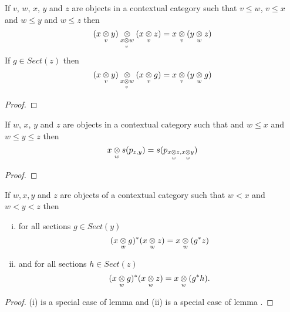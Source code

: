 \begin{lemma}
If $v$, $w$, $x$, $y$ and $z$ are objects in a contextual category  \catcw 
such that $v \leq w$, $v \leq x$ and $w \leq y$ and $w \leq z$ then
\begin{equation*}
\crossx{(\crossx{x}{y}{v})}{(\crossx{x}{z}{v})}{\crossx{x}{w}{v}}=\crossx{x}{{(\crossx{y}{z}{w})}}{v}
\end{equation*}
If $g \in Sect(z)$ then
\begin{equation*}
\crossx{(\crossx{x}{y}{v})}{(\crossx{x}{g}{v})}{\crossx{x}{w}{v}}=\crossx{x}{{(\crossx{y}{g}{w})}}{v}
\end{equation*}
\end{lemma}
\begin{proof}
\tbd
\end{proof}

\begin{lemma}
If $w$, $x$, $y$ and $z$ are objects in a contextual category  \catcw 
such that  and $w \leq x$ and $w \leq y \leq z$ then
\begin{equation*}
\crossx{x}{s(p_{z,y})}{w}= s(p_{\crossx{x}{z}{w},\crossx{x}{y}{w}})
\end{equation*}
\end{lemma}
\begin{proof}
\tbd
\end{proof}

\begin{lemma}
If $w,x,y$ and $z$ are objects of a contextual category \catcw such that $w < x$ and  $w < y < z$ then  
\begin{enumerate}[(i)]
\item for all sections $g \in Sect(y)$ 
\begin{equation*}
(\crossx{x}{g}{w})^*(\crossx{x}{z}{w})=\crossx{x}{(g^*z)}{w}
\end{equation*}
\item and for all sections $h \in Sect(z)$ 
\begin{equation*}
(\crossx{x}{g}{w})^*(\crossx{x}{z}{w})=\crossx{x}{(g^*h)}{w}.
\end{equation*}
\end{enumerate}
\end{lemma}
\begin{proof}
(i) is a special case of lemma 
and
(ii) is a special case of lemma .
\end{proof}

